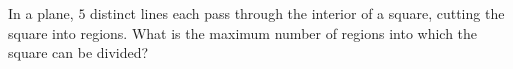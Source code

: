 In a plane, $5$ distinct lines each pass through the interior of a square, cutting the square into regions. What is the maximum number of regions into which the square can be divided?
